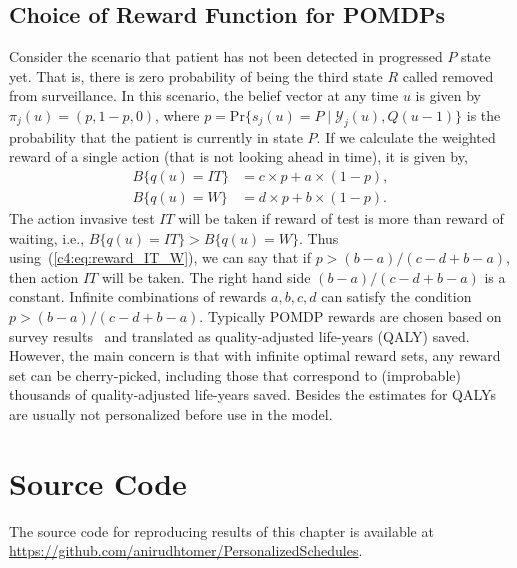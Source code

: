 \begin{subappendices}
\subsection{Choice of Reward Function for POMDPs}
Consider the scenario that patient has not been detected in progressed $P$ state yet. That is, there is zero probability of being the third state $R$ called removed from surveillance. In this scenario, the belief vector at any time $u$ is given by $\pi_j(u) = (p, 1-p, 0)$, where $p=\mbox{Pr}\big\{s_j(u)=P \mid \mathcal{Y}_j(u), Q(u-1)\big\}$ is the probability that the patient is currently in state $P$. If we calculate the weighted reward of a single action (that is not looking ahead in time), it is given by,
\begin{equation}
\label{c4:eq:reward_IT_W}
\begin{split}
B\big\{q(u)=IT\big\} &= c\times p + a \times (1-p),\\
B\big\{q(u)=W\big\} &= d\times p + b \times (1-p).
\end{split}
\end{equation}
The action invasive test $IT$ will be taken if reward of test is more than reward of waiting, i.e., $B\big\{q(u)=IT\big\} > B\big\{q(u)=W\big\}$. Thus using~(\ref{c4:eq:reward_IT_W}), we can say that if $p > (b-a)/(c-d + b-a)$, then action $IT$ will be taken. The right hand side $(b-a)/(c-d + b-a)$ is a constant. Infinite combinations of rewards $a,b,c,d$ can satisfy the condition $p > (b-a)/(c-d + b-a)$. Typically POMDP rewards are chosen based on survey results~\citep{steimle2017markov} and translated as quality-adjusted life-years (QALY) saved. However, the main concern is that with infinite optimal reward sets, any reward set can be cherry-picked, including those that correspond to (improbable) thousands of quality-adjusted life-years saved. Besides the estimates for QALYs are usually not personalized before use in the model.

\section{Source Code}
\label{c4:appendix:source_code}
The source code for reproducing results of this chapter is available at \url{https://github.com/anirudhtomer/PersonalizedSchedules}.
\end{subappendices}